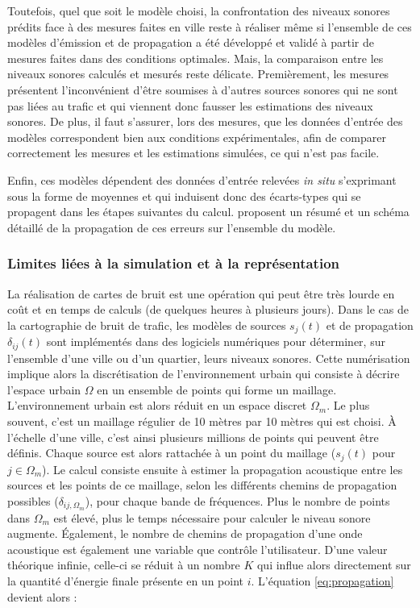 Toutefois, quel que soit le modèle choisi, la confrontation des niveaux sonores prédits face à des mesures faites en ville reste à réaliser même si l'ensemble de ces modèles d'émission et de propagation a été développé et validé à partir de mesures faites dans des conditions optimales. Mais, la comparaison entre les niveaux sonores calculés et mesurés reste délicate. Premièrement, les mesures présentent l'inconvénient d'être soumises à d'autres sources sonores qui ne sont pas liées au trafic et qui viennent donc fausser les estimations des niveaux sonores. De plus, il faut s'assurer, lors des mesures, que les données d'entrée des modèles correspondent bien aux conditions expérimentales, afin de comparer correctement les mesures et les estimations simulées, ce qui n'est pas facile.

Enfin, ces modèles dépendent des données d'entrée relevées \textit{in situ} s'exprimant sous la forme de moyennes et qui induisent donc des écarts-types qui se propagent dans les étapes suivantes du calcul. \cite{van_leeuwen_noise_2015} proposent un résumé et un schéma détaillé de la propagation de ces erreurs sur l'ensemble du modèle.

\subsubsection{Limites liées à la simulation et à la représentation}

La réalisation de cartes de bruit est une opération qui peut être très lourde en coût et en temps de calculs (de quelques heures à plusieurs jours).
Dans le cas de la cartographie de bruit de trafic, les modèles de sources $s_j(t)$ et de propagation $\delta_{ij}(t)$ sont implémentés dans des logiciels numériques pour déterminer, sur l'ensemble d'une ville ou d'un quartier, leurs niveaux sonores. Cette numérisation implique alors la discrétisation de l'environnement urbain qui consiste à décrire l'espace urbain $\Omega$ en un ensemble de points qui forme un maillage. L'environnement urbain est alors réduit en un espace discret $\Omega_m$. Le plus souvent, c'est un maillage régulier de 10 mètres par 10 mètres qui est choisi. À l'échelle d'une ville, c'est ainsi plusieurs millions de points qui peuvent être définis. Chaque source est alors rattachée à un point du maillage ($s_{j}(t)$ pour $j\in\Omega_m$). Le calcul consiste ensuite à estimer la propagation acoustique entre les sources et les points de ce maillage, selon les différents chemins de propagation possibles ($\delta_{ij,\Omega_m}$), pour chaque bande de fréquences. Plus le nombre de points dans $\Omega_{m}$ est élevé, plus le temps nécessaire pour calculer le niveau sonore augmente.  
Également, le nombre de chemins de propagation d'une onde acoustique est également une variable que contrôle l'utilisateur. D'une valeur théorique infinie, celle-ci se réduit à un nombre $K$ qui influe alors directement sur la quantité d'énergie finale présente en un point $i$. L'équation \ref{eq:propagation} devient alors : 


